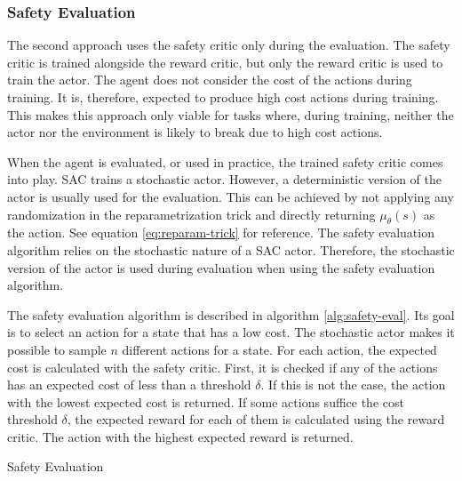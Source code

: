 \subsubsection{Safety Evaluation}
\label{sec:safety-eval}

The second approach uses the safety critic only during the evaluation. The safety critic is trained alongside the reward critic, but only the reward critic is used to train the actor. The agent does not consider the cost of the actions during training. It is, therefore, expected to produce high cost actions during training. This makes this approach only viable for tasks where, during training, neither the actor nor the environment is likely to break due to high cost actions.

When the agent is evaluated, or used in practice, the trained safety critic comes into play. SAC trains a stochastic actor. However, a deterministic version of the actor is usually used for the evaluation. This can be achieved by not applying any randomization in the reparametrization trick and directly returning $\mu_\theta(s)$ as the action. See equation \ref{eq:reparam-trick} for reference. The safety evaluation algorithm relies on the stochastic nature of a SAC actor. Therefore, the stochastic version of the actor is used during evaluation when using the safety evaluation algorithm.

The safety evaluation algorithm is described in algorithm \ref{alg:safety-eval}. Its goal is to select an action for a state that has a low cost. The stochastic actor makes it possible to sample $n$ different actions for a state. For each action, the expected cost is calculated with the safety critic. First, it is checked if any of the actions has an expected cost of less than a threshold $\delta$. If this is not the case, the action with the lowest expected cost is returned. If some actions suffice the cost threshold $\delta$, the expected reward for each of them is calculated using the reward critic. The action with the highest expected reward is returned.

\begin{algorithm}[btp]
    \caption{Safety Evaluation}
    \label{alg:safety-eval}

    \DontPrintSemicolon
    


    
    \BlankLine
\end{algorithm}

